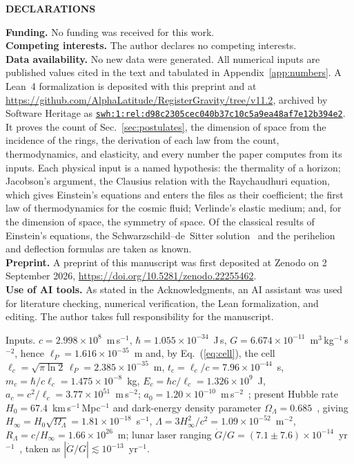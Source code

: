 \documentclass[aps,prd,twocolumn,superscriptaddress,nofootinbib,showkeys]{revtex4-2}
\makeatletter
\newcommand{\lc}{\ell_c}
\newcommand{\tc}{t_c}
\newcommand{\mc}{m_c}
\newcommand{\Ec}{E_c}
\newcommand{\ac}{a_c}
\newcommand{\RL}{R_\Lambda}
\newcommand{\swhid}[1]{{\def\UrlBreaks{\do\:\do0\do1\do2\do3\do4\do5\do6\do7\do8\do9\do a\do b\do c\do d\do e\do f}\href{https://archive.softwareheritage.org/#1}{\nolinkurl{#1}}}}
\def\section{\@startsection{section}{1}{\z@}{0.6cm \@plus1ex \@minus .2ex}{0.35cm}{\normalfont\small\bfseries}}
\makeatother
\begin{document}
\par\medskip\centerline{\small\bfseries DECLARATIONS}\par\smallskip
\noindent\textbf{Funding.} No funding was received for this work.\\
\textbf{Competing interests.} The author declares no competing interests.\\
\textbf{Data availability.} No new data were generated. All numerical inputs are published values cited in the text and tabulated in Appendix~\ref{app:numbers}. A Lean~4 formalization is deposited with this preprint and at \url{https://github.com/AlphaLatitude/RegisterGravity/tree/v11.2}, archived by Software Heritage as \swhid{swh:1:rel:d98c2305cec040b37c10c5a9ea48af7e12b394e2}. It proves the count of Sec.~\ref{sec:postulates}, the dimension of space from the incidence of the rings, the derivation of each law from the count, thermodynamics, and elasticity, and every number the paper computes from its inputs. Each physical input is a named hypothesis: the thermality of a horizon; Jacobson's argument, the Clausius relation with the Raychaudhuri equation, which gives Einstein's equations and enters the files as their coefficient; the first law of thermodynamics for the cosmic fluid; Verlinde's elastic medium; and, for the dimension of space, the symmetry of space. Of the classical results of Einstein's equations, the Schwarzschild--de~Sitter solution~\cite{kottler1918} and the perihelion and deflection formulas are taken as known.\\
\textbf{Preprint.} A preprint of this manuscript was first deposited at Zenodo on 2 September 2026, \url{https://doi.org/10.5281/zenodo.22255462}.\\
\textbf{Use of AI tools.} As stated in the Acknowledgments, an AI assistant was used for literature checking, numerical verification, the Lean formalization, and editing. The author takes full responsibility for the manuscript.

\appendix

\section{Numerical Values}
\label{app:numbers}

Inputs. $c = 2.998\times10^8$~m\,s$^{-1}$, $\hbar = 1.055\times10^{-34}$~J\,s, $G = 6.674\times10^{-11}$~m$^3$\,kg$^{-1}$\,s$^{-2}$, hence $\ell_P = 1.616\times10^{-35}$~m and, by Eq.~(\ref{eq:cell}), the cell $\lc = \sqrt{\pi\ln2}\,\ell_P = 2.385\times10^{-35}$~m, $\tc = \lc/c = 7.96\times10^{-44}$~s, $\mc = \hbar/c\lc = 1.475\times10^{-8}$~kg, $\Ec = \hbar c/\lc = 1.326\times10^9$~J, $\ac = c^2/\lc = 3.77\times10^{51}$~m\,s$^{-2}$; $a_0 = 1.20\times10^{-10}$~m\,s$^{-2}$~\cite{mcgaugh2016}; present Hubble rate $H_0 = 67.4$~km\,s$^{-1}$\,Mpc$^{-1}$ and dark-energy density parameter $\Omega_\Lambda = 0.685$~\cite{planck2018}, giving $H_\infty = H_0\sqrt{\Omega_\Lambda} = 1.81\times10^{-18}$~s$^{-1}$, $\Lambda = 3H_\infty^2/c^2 = 1.09\times10^{-52}$~m$^{-2}$, $\RL = c/H_\infty = 1.66\times10^{26}$~m; lunar laser ranging $\dot G/G = (7.1\pm7.6)\times10^{-14}$~yr$^{-1}$~\cite{hofmann2018}, taken as $|\dot G/G|\lesssim10^{-13}$~yr$^{-1}$.
\end{document}
